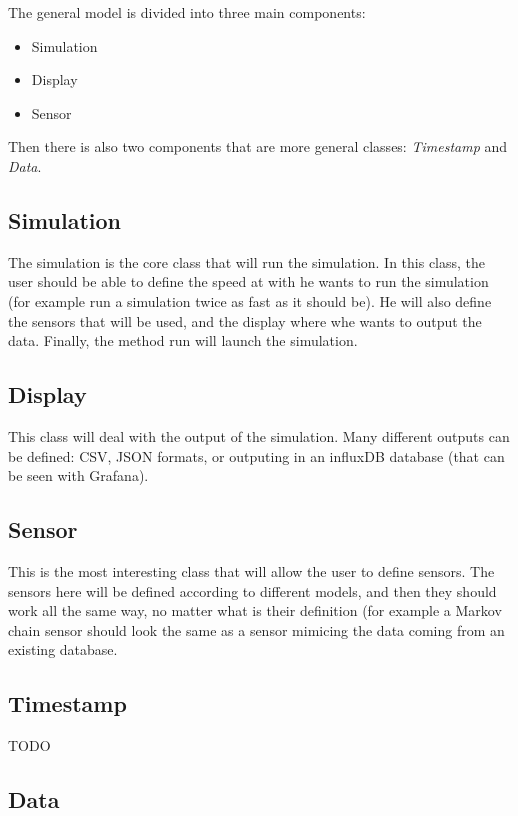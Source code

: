 

The general model is divided into three main components:
\begin{itemize}
\item Simulation
\item Display
\item Sensor
\end{itemize}

Then there is also two components that are more general classes: \emph{Timestamp} and \emph{Data}.

\subsection{Simulation}

The simulation is the core class that will run the simulation. In this class, the user should be able to define the speed at with he wants to run the simulation (for example run a simulation twice as fast as it should be). He will also define the sensors that will be used, and the display where whe wants to output the data. Finally, the method run will launch the simulation.


\subsection{Display}

This class will deal with the output of the simulation. Many different outputs can be defined: CSV, JSON formats, or outputing in an influxDB database (that can be seen with Grafana).


\subsection{Sensor}

This is the most interesting class that will allow the user to define sensors. The sensors here will be defined according to different models, and then they should work all the same way, no matter what is their definition (for example a Markov chain sensor should look the same as a sensor mimicing the data coming from an existing database.


\subsection{Timestamp}

TODO


\subsection{Data}







